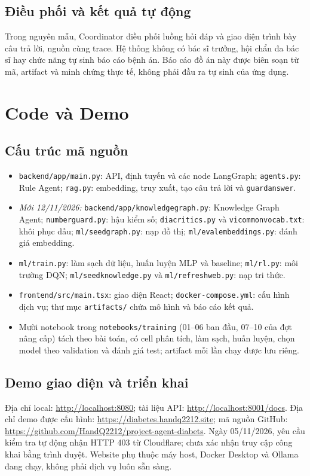 \documentclass[12pt,a4paper]{article}
\renewcommand{\_}{\textunderscore\allowbreak}\setlength{\emergencystretch}{3em}
\begin{document}
\subsection{Điều phối và kết quả tự động}
Trong nguyên mẫu, Coordinator điều phối luồng hỏi đáp và giao diện trình bày câu trả lời, nguồn cùng trace. Hệ thống không có bác sĩ trưởng, hội chẩn đa bác sĩ hay chức năng tự sinh báo cáo bệnh án. Báo cáo đồ án này được biên soạn từ mã, artifact và minh chứng thực tế, không phải đầu ra tự sinh của ứng dụng.
\section{Code và Demo}
\subsection{Cấu trúc mã nguồn}
\begin{itemize}
\item \texttt{backend/app/main.py}: API, định tuyến và các node LangGraph; \texttt{agents.py}: Rule Agent; \texttt{rag.py}: embedding, truy xuất, tạo câu trả lời và \texttt{guard\_answer}.\item \emph{Mới 12/11/2026:} \texttt{backend/app/knowledge\_graph.py}: Knowledge Graph Agent; \texttt{number\_guard.py}: hậu kiểm số; \texttt{diacritics.py} và \texttt{vi\_common\_vocab.txt}: khôi phục dấu; \texttt{ml/seed\_graph.py}: nạp đồ thị; \texttt{ml/eval\_embeddings.py}: đánh giá embedding.
\item \texttt{ml/train.py}: làm sạch dữ liệu, huấn luyện MLP và baseline; \texttt{ml/rl.py}: môi trường DQN; \texttt{ml/seed\_knowledge.py} và \texttt{ml/refresh\_web.py}: nạp tri thức.
\item \texttt{frontend/src/main.tsx}: giao diện React; \texttt{docker-compose.yml}: cấu hình dịch vụ; thư mục \texttt{artifacts/} chứa mô hình và báo cáo kết quả.
\item Mười notebook trong \texttt{notebooks/training} (01--06 ban đầu, 07--10 của đợt nâng cấp) tách theo bài toán, có cell phân tích, làm sạch, huấn luyện, chọn model theo validation và đánh giá test; artifact mỗi lần chạy được lưu riêng.
\end{itemize}

\subsection{Demo giao diện và triển khai}
Địa chỉ local: \url{http://localhost:8080}; tài liệu API: \url{http://localhost:8001/docs}. Địa chỉ demo được cấu hình: \url{https://diabetes.handq2212.site}; mã nguồn GitHub: \url{https://github.com/HandQ2212/project-agent-diabets}. Ngày 05/11/2026, yêu cầu kiểm tra tự động nhận HTTP 403 từ Cloudflare; chưa xác nhận truy cập công khai bằng trình duyệt. Website phụ thuộc máy host, Docker Desktop và Ollama đang chạy, không phải dịch vụ luôn sẵn sàng.
\end{document}
